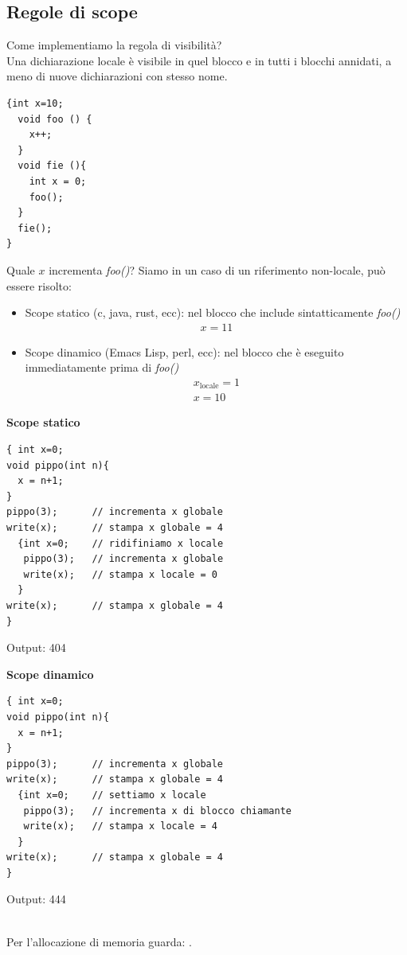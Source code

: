 \documentclass[a4paper,12pt]{article}
\begin{document}
\subsection{Regole di scope}
\label{sec:scope}
Come implementiamo la regola di visibilità? \\
Una dichiarazione locale è visibile in quel blocco e in tutti i blocchi annidati, a meno di nuove dichiarazioni con stesso nome.
\begin{lstlisting}
{int x=10;
  void foo () {
    x++;
  }
  void fie (){
    int x = 0;
    foo();
  }
  fie();
}
\end{lstlisting}
Quale $x$ incrementa \textit{foo()}? Siamo in un caso di un riferimento non-locale, può essere risolto:
\begin{itemize}
  \item Scope statico (c, java, rust, ecc): nel blocco che include sintatticamente \textit{foo()}
  \begin{align*}
    x=11
  \end{align*}
  \item Scope dinamico (Emacs Lisp, perl, ecc): nel blocco che è eseguito immediatamente prima di \textit{foo()}
    \begin{align*}
    x_\text{locale} = 1 \\
    x = 10
  \end{align*}
\end{itemize}
\noindent
\begin{minipage}{0.48\textwidth}
\textbf{Scope statico}\\[2mm]
\begin{lstlisting}
{ int x=0;
void pippo(int n){
  x = n+1;
}
pippo(3);      // incrementa x globale
write(x);      // stampa x globale = 4
  {int x=0;    // ridifiniamo x locale
   pippo(3);   // incrementa x globale
   write(x);   // stampa x locale = 0
  }
write(x);      // stampa x globale = 4
}
\end{lstlisting}
Output: 404
\end{minipage}%
\hfill
\begin{minipage}{0.48\textwidth}
\textbf{Scope dinamico}\\[2mm]
\begin{lstlisting}
{ int x=0;
void pippo(int n){
  x = n+1;
}
pippo(3);      // incrementa x globale
write(x);      // stampa x globale = 4
  {int x=0;    // settiamo x locale
   pippo(3);   // incrementa x di blocco chiamante
   write(x);   // stampa x locale = 4
  }
write(x);      // stampa x globale = 4
}
\end{lstlisting}
Output: 444
\end{minipage}
\vspace{1em}\\
Per l'allocazione di memoria guarda: .
\end{document}
